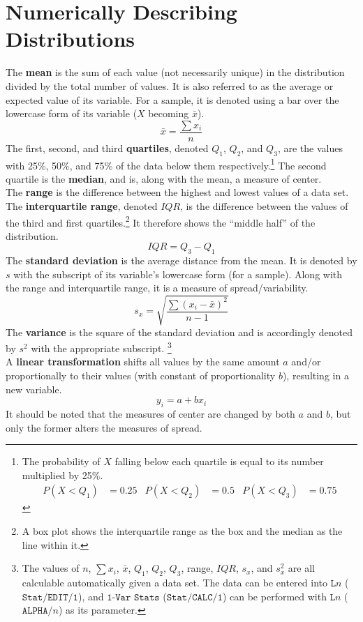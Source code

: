 \documentclass[../AP_Statistics.tex]{subfiles}
\begin{document}
		\section{Numerically Describing Distributions}
			The \textbf{mean} is the sum of each value (not necessarily unique) in the distribution divided by the total number of values. It is also referred to as the average or expected value of its variable. For a sample, it is denoted using a bar over the lowercase form of its variable ($X$ becoming $\bar{x}$).
			$$\bar{x} = \frac{\sum x_i}{n}$$
			The first, second, and third \textbf{quartiles}, denoted $Q_1$, $Q_2$, and $Q_3$, are the values with 25\%, 50\%, and 75\% of the data below them respectively.\footnote{The probability of $X$ falling below each quartile is equal to its number multiplied by 25\%. \begin{align*} P(X < Q_1) &= 0.25 & P(X < Q_2) &= 0.5 & P(X < Q_3) &= 0.75\end{align*}} The second quartile is the \textbf{median}, and is, along with the mean, a measure of center. \\
			The \textbf{range} is the difference between the highest and lowest values of a data set. \\
			The \textbf{interquartile range}, denoted $IQR$, is the difference between the values of the third and first quartiles.\footnote{A box plot shows the interquartile range as the box and the median as the line within it.} It therefore shows the \enquote{middle half} of the distribution.
			$$IQR = Q_3 - Q_1$$
			The \textbf{standard deviation} is the average distance from the mean. It is denoted by $s$  with the subscript of its variable's lowercase form (for a sample). Along with the range and interquartile range, it is a measure of spread/variability.
			$$s_x = \sqrt{\frac{\sum (x_i - \bar{x})^2}{n - 1}}$$
			The \textbf{variance} is the square of the standard deviation and is accordingly denoted by $s^2$ with the appropriate subscript. \footnote{The values of $n$, $\sum x_i$, $\bar{x}$, $Q_1$, $Q_2$, $Q_3$,  range, $IQR$, $s_x$, and $s_x^2$ are all calculable automatically given a data set. The data can be entered into $\texttt{L}n$ ($\texttt{Stat/EDIT/1}$), and $\texttt{1-Var Stats}$ ($\texttt{Stat/CALC/1}$) can be performed with $\texttt{L}n$ ($\texttt{ALPHA/}n$) as its parameter.} \\
			A \textbf{linear transformation} shifts all values by the same amount $a$ and/or proportionally to their values (with constant of proportionality $b$), resulting in a new variable. 
			$$y_i = a + bx_i$$
			It should be noted that the measures of center are changed by both $a$ and $b$, but only the former alters the measures of spread.
\end{document}
